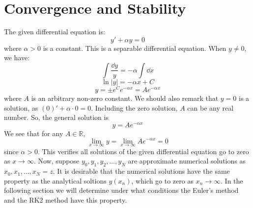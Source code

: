 \documentclass{article}
\def\RR{{\mathbb R}}
\begin{document}
\section{Convergence and Stability}
The given differential equation is:
\begin{equation}
  y' + \alpha y =0
\end{equation}
where \(\alpha>0\) is a constant.
This is a separable differential equation. When \(y\ne 0\), we have:
\begin{equation}
   \int \frac{\dd y}{y} = -\alpha \int \dd x
\end{equation}
\begin{equation}
  \ln|y| = -\alpha x +C
\end{equation}
\begin{equation}
  y = \pm e^C e^{-\alpha x} = A e^{-\alpha x}
\end{equation}
where \(A\) is an arbitrary non-zero constant. We should also remark that \(y=0\) is a solution, as \((0)'+\alpha \cdot 0 =0\).
Including the zero solution, \(A\) can be any real number. So, the general solution is
\begin{equation}
   y = A e^{-\alpha x}
\end{equation}
We see that for any \(A\in \RR\),
\begin{equation}
  \lim_{x\to \infty} y = \lim_{x\to \infty} A e^{-\alpha x} = 0
\end{equation}
since \(\alpha >0\). This verifies all solutions of the given differential equation go to zero as \(x\to \infty\).
Now, suppose \(y_0, y_1, y_2, \ldots, y_N\) are approximate numerical solutions as \(x_0, x_1, \ldots,x_N=z\).
It is desirable that the numerical solutions have the same property as the analytical soltions \(y(x_n)\),
which go to zero as \(x_n \to \infty\). In the following section we will determine under what conditions
the Euler's method and the RK2 method have this property. \\
\end{document}
